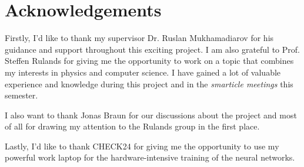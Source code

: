 \chapter*{Acknowledgements}
Firstly, I'd like to thank my supervisor Dr. Ruslan Mukhamadiarov for his guidance and support throughout this exciting project. I am also grateful to Prof. Steffen Rulands for giving me the opportunity to work on a topic that combines my interests in physics and computer science. I have gained a lot of valuable experience and knowledge during this project and in the \textit{smarticle meetings} this semester. 


I also want to thank Jonas Braun for our discussions about the project and most of all for drawing my attention to the Rulands group in the first place. 


Lastly, I'd like to thank CHECK24 for giving me the opportunity to use my powerful work laptop for the hardware-intensive training of the neural networks.